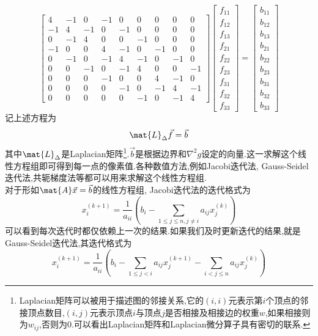\documentclass{ctexart}
\begin{document}
\[\begin{bmatrix}
    4&-1&0&-1&0&0&0&0&0\\
    -1&4&-1&0&-1&0&0&0&0\\
    0&-1&4&0&0&-1&0&0&0\\
    -1&0&0&4&-1&0&-1&0&0\\
    0&-1&0&-1&4&-1&0&-1&0\\
    0&0&-1&0&-1&4&0&0&-1\\
    0&0&0&-1&0&0&4&-1&0\\
    0&0&0&0&-1&0&-1&4&-1\\
    0&0&0&0&0&-1&0&-1&4
\end{bmatrix}\begin{bmatrix}
    f_{11}\\f_{12}\\f_{13}\\f_{21}\\f_{22}\\f_{23}\\f_{31}\\f_{32}\\f_{33}
\end{bmatrix}=\begin{bmatrix}
    b_{11}\\b_{12}\\b_{13}\\b_{21}\\b_{22}\\b_{23}\\b_{31}\\b_{32}\\b_{33}
\end{bmatrix}\]
记上述方程为
\[\mat{L}_{\Delta}\vec{f}=\vec{b}\]
其中$\mat{L}_{\Delta}$是Laplacian矩阵\footnote{Laplacian矩阵可以被用于描述图的邻接关系,它的$(i,i)$元表示第$i$个顶点的邻接顶点数目,$(i,j)$元表示顶点$i$与顶点$j$是否相接及相接边的权重$w$,如果相接则为$w_{ij}$,否则为$0$.可以看出Laplacian矩阵和Laplacian微分算子具有密切的联系.}.$\vec{b}$是根据边界和$\nabla^2 g$设定的向量.这一求解这个线性方程组即可得到每一点的像素值.各种数值方法,例如Jacobi迭代法, Gauss-Seidel迭代法,共轭梯度法等都可以用来求解这个线性方程组.\\
\indent 对于形如$\mat{A}\vec{x}=\vec{b}$的线性方程组, Jacobi迭代法的迭代格式为
\[x_i^{(k+1)}=\dfrac{1}{a_{ii}}\left(b_i-\sum_{1\leqslant j\leqslant n,j\neq i}a_{ij}x_j^{(k)}\right)\]
可以看到每次迭代时都仅依赖上一次的结果.如果我们及时更新迭代的结果,就是Gauss-Seidel迭代法,其迭代格式为
\[x_i^{(k+1)}=\dfrac{1}{a_{ii}}\left(b_i-\sum_{1\leqslant j<i}a_{ij}x_j^{(k+1)}-\sum_{i<j\leqslant n}a_{ij}x_j^{(k)}\right)\]
\end{document}
